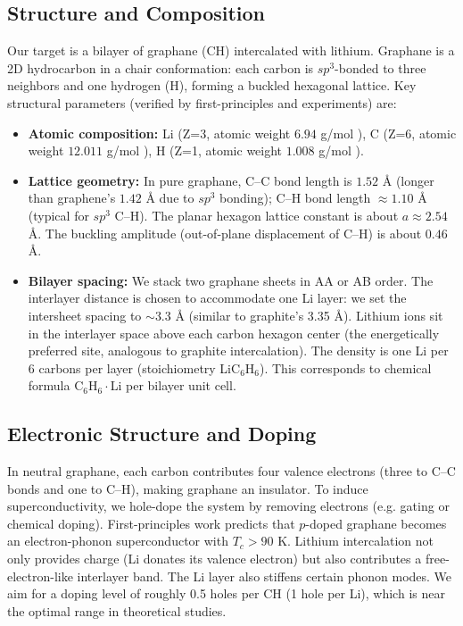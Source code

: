 \documentclass[11pt,a4paper]{article}
\begin{document}
\subsection{Structure and Composition}
\label{subsec:structure_composition_detailed}
Our target is a bilayer of graphane (CH) intercalated with lithium. Graphane is a 2D hydrocarbon in a chair conformation: each carbon is $sp^3$-bonded to three neighbors and one hydrogen (H), forming a buckled hexagonal lattice. Key structural parameters (verified by first-principles and experiments) are:
\begin{itemize}
\item \textbf{Atomic composition:} Li (Z=3, atomic weight $6.94$ g/mol ), C (Z=6, atomic weight $12.011$ g/mol ), H (Z=1, atomic weight $1.008$ g/mol ).
\item \textbf{Lattice geometry:} In pure graphane, C–C bond length is $1.52$ Å (longer than graphene’s $1.42$ Å due to $sp^3$ bonding); C–H bond length $\approx 1.10$ Å (typical for $sp^3$ C–H). The planar hexagon lattice constant is about $a \approx 2.54$ Å. The buckling amplitude (out-of-plane displacement of C–H) is about $0.46$ Å.
\item \textbf{Bilayer spacing:} We stack two graphane sheets in AA or AB order. The interlayer distance is chosen to accommodate one Li layer: we set the intersheet spacing to $\sim 3.3$ Å (similar to graphite’s 3.35 Å). Lithium ions sit in the interlayer space above each carbon hexagon center (the energetically preferred site, analogous to graphite intercalation). The density is one Li per 6 carbons per layer (stoichiometry LiC$_6$H$_6$). This corresponds to chemical formula C$_6$H$_6 \cdot$Li per bilayer unit cell.
\end{itemize}

\subsection{Electronic Structure and Doping}
\label{subsec:electronic_structure_doping_detailed}
In neutral graphane, each carbon contributes four valence electrons (three to C–C bonds and one to C–H), making graphane an insulator. To induce superconductivity, we hole-dope the system by removing electrons (e.g. gating or chemical doping). First-principles work predicts that $p$-doped graphane becomes an electron-phonon superconductor with $T_c > 90$ K. Lithium intercalation not only provides charge (Li donates its valence electron) but also contributes a free-electron-like interlayer band. The Li layer also stiffens certain phonon modes. We aim for a doping level of roughly 0.5 holes per CH (1 hole per Li), which is near the optimal range in theoretical studies.
\end{document}
